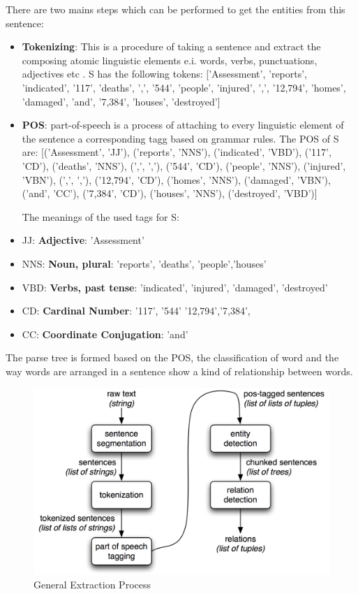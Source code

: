 There are two mains steps which can
be performed to get the entities from  this sentence:
\begin{itemize}
\item \textbf{Tokenizing}: This is a procedure of taking a sentence and extract
the composing atomic linguistic elements e.i.
words, verbs, punctuations, adjectives etc .
S has the following tokens: ['Assessment', 'reports', 'indicated', '117', 'deaths', ',', '544', 'people', 'injured', ',', '12,794', 'homes', 'damaged', 'and', '7,384', 'houses', 'destroyed']
\item \textbf{POS}: part-of-speech is a process of attaching to every linguistic element of the sentence a corresponding tagg
based on grammar rules.
The POS of S  are: 
[('Assessment', 'JJ'), ('reports', 'NNS'), ('indicated', 'VBD'), ('117', 'CD'), ('deaths', 'NNS'), (',', ','), ('544', 'CD'), ('people', 'NNS'), ('injured', 'VBN'), (',', ','), ('12,794', 'CD'), ('homes', 'NNS'), ('damaged', 'VBN'), ('and', 'CC'), ('7,384', 'CD'), ('houses', 'NNS'), ('destroyed', 'VBD')]

The meanings of the used tags for S:
\end{itemize}
\begin{itemize}
\item JJ: \textbf{Adjective}: 'Assessment'   
\item NNS: \textbf{Noun, plural}: 'reports', 'deaths', 'people','houses'
\item VBD: \textbf{Verbs, past tense}: 'indicated',             'injured', 'damaged', 'destroyed'
\item CD: \textbf{Cardinal Number}: '117', '544' '12,794','7,384',
\item CC: \textbf{Coordinate Conjugation}: 'and'
\end{itemize}
The parse tree is formed based on the POS, the classification of word and the way words are arranged in a sentence show a kind of relationship between words.
\begin{figure}[hbtp]
\caption{General Extraction Process }
\centering
\includegraphics[scale=0.7]{images/pos.png}
\end{figure}
